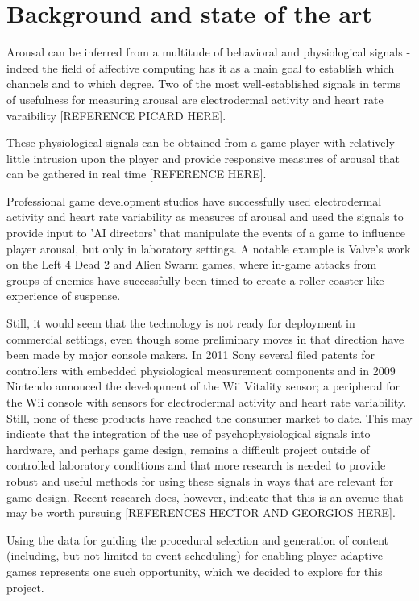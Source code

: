 \documentclass{llncs}
\begin{document}
\section{Background and state of the art}
Arousal can be inferred from a multitude of behavioral and physiological signals - indeed the field of affective computing has it as a main goal to establish which channels and to which degree. Two of the most well-established signals in terms of usefulness for measuring arousal are electrodermal activity and heart rate varaibility [REFERENCE PICARD HERE]. 

These physiological signals can be obtained from a game player with relatively little intrusion upon the player and provide responsive measures of arousal that can be gathered in real time [REFERENCE HERE].

Professional game development studios have successfully used electrodermal activity and heart rate variability as measures of arousal and used the signals to provide input to 'AI directors' that manipulate the events of a game to influence player arousal, but only in laboratory settings.
A notable example is Valve's work on the Left 4 Dead 2 and Alien Swarm games, where in-game attacks from groups of enemies have successfully been timed to create a roller-coaster like experience of suspense.

Still, it would seem that the technology is not ready for deployment in commercial settings, even though some preliminary moves in that direction have been made by major console makers. In 2011 Sony several filed patents for controllers with embedded physiological measurement components and in 2009 Nintendo annouced the development of the Wii Vitality sensor; a peripheral for the Wii console with sensors for electrodermal activity and heart rate variability. Still, none of these products have reached the consumer market to date. This may indicate that the integration of the use of psychophysiological signals into hardware, and perhaps game design, remains a difficult project outside of controlled laboratory conditions and that more research is needed to provide robust and useful methods for using these signals in ways that are relevant for game design. Recent research does, however, indicate that this is an avenue that may be worth pursuing [REFERENCES HECTOR AND GEORGIOS HERE].

Using the data for guiding the procedural selection and generation of content (including, but not limited to event scheduling) for enabling player-adaptive games represents one such opportunity, which we decided to explore for this project.
\end{document}

